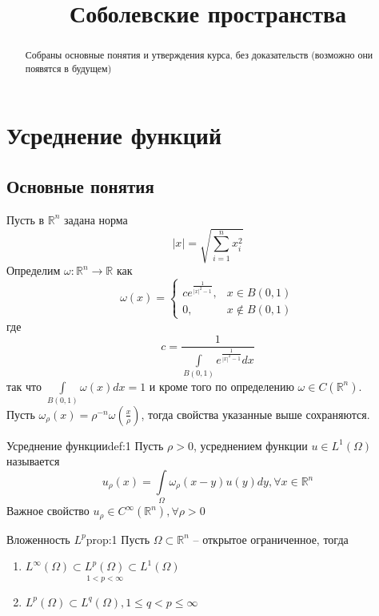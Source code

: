 \documentclass[12pt,a4paper]{article}
\title{Соболевские пространства}
\newcommand{\intset}[1]{\int\limits_{#1}}
\newcommand{\Real}{\mathbb{R}}
\begin{document}
	
\maketitle
\begin{abstract}
	Собраны основные понятия и утверждения курса, без доказательств (возможно они появятся в будущем)
\end{abstract}

\section{Усреднение функций}
	
\subsection{Основные понятия}

Пусть в $\Real^n$ задана норма 
$$|x| = \sqrt{\sum_{i=1}^{n}{x_i^2}}$$ 
Определим $\omega: \Real^n \to \Real$ как
\begin{equation*}
	\omega (x) = 
		\begin{cases}
		c e^{\frac{1}{|x|^2 - 1}}, & x \in B(0, 1) \\
		0, & x \notin B(0, 1)
		\end{cases}
\end{equation*}
где 
$$c  = \frac{1}{\intset{B(0,1)}{e^{\frac{1}{|x|^2 - 1}}dx}}$$
так что $\intset{B(0,1)}{\omega(x)dx} = 1$ и кроме того по определению $\omega \in C(\Real^n)$. \\ Пусть $\omega_\rho (x) = \rho^{-n} \omega \left(\frac{x}{\rho}\right)$, тогда свойства указанные выше сохраняются.

\begin{definition}{Усреднение функции}{def:1}
	Пусть $\rho > 0$, усреднением функции $u \in L^{1}(\Omega)$ называется 
	$$u_\rho (x) = \intset{\Omega}{\omega_\rho (x - y) u(y) dy}, \forall x \in \Real^n$$
	Важное свойство $u_\rho \in C^{\infty}(\Real^n), \forall \rho > 0$
\end{definition}

\begin{proposition}{Вложенность $L^p$}{prop:1}
	Пусть $\Omega \subset \Real^n$ -- открытое ограниченное, тогда
	\begin{enumerate}
		\item $L^{\infty}(\Omega) \subset \underset{1 < p < \infty}{L^{p}(\Omega)} \subset L^{1}(\Omega)$
		\item $L^{p}(\Omega) \subset L^{q}(\Omega), 1 \leq q < p \leq \infty$
	\end{enumerate}
\end{proposition}
\end{document}
